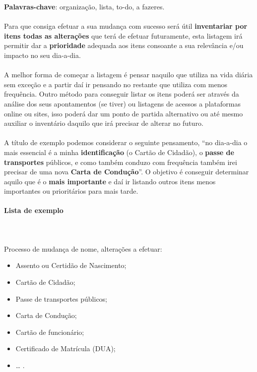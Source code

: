 \textbf{Palavras-chave}: organização, lista, to-do, a fazeres. \\
\\
Para que consiga efetuar a sua mudança com sucesso será útil
\textbf{inventariar por itens todas as alterações} que terá de efetuar
futuramente, esta listagem irá permitir dar a \textbf{prioridade}
adequada aos itens consoante a sua relevância e/ou impacto no seu
dia-a-dia. \\
\\
A melhor forma de começar a listagem é pensar naquilo que utiliza na
vida diária sem exceção e a partir daí ir pensando no restante que
utiliza com menos frequência. Outro método para conseguir listar os
itens poderá ser através da análise dos seus apontamentos (se tiver) ou
listagens de acessos a plataformas online ou sites, isso poderá dar um
ponto de partida alternativo ou até mesmo auxiliar o inventário daquilo
que irá precisar de alterar no futuro. \\
\\
A título de exemplo podemos considerar o seguinte pensamento, ``no
dia-a-dia o mais essencial é a minha \textbf{identificação} (o Cartão de
Cidadão), o \textbf{passe de transportes} públicos, e como também
conduzo com frequência também irei precisar de uma nova \textbf{Carta de
	Condução}''. O objetivo é conseguir determinar aquilo que é o
\textbf{mais importante} e daí ir listando outros itens menos
importantes ou prioritários para mais tarde. \\

\newpage

\paragraph{Lista de exemplo}
\leavevmode\\\\
Processo de mudança de nome, alterações a efetuar:
\begin{itemize}
	\item Assento ou Certidão de Nascimento;
	\item Cartão de Cidadão;
	\item Passe de transportes públicos;
	\item Carta de Condução;
	\item Cartão de funcionário;
	\item Certificado de Matrícula (DUA);
	\item \ldots{} .
\end{itemize}

